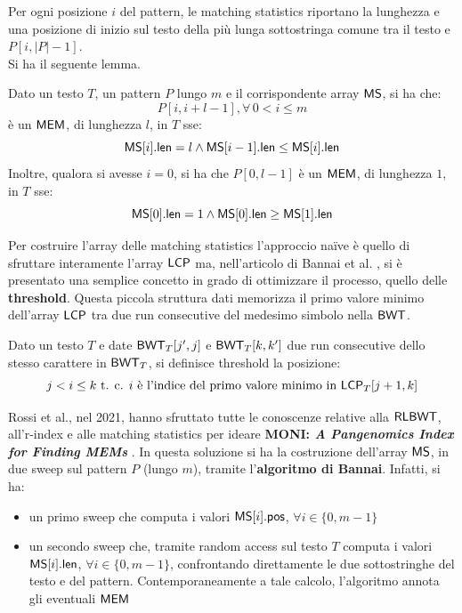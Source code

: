 \noindent
Per ogni posizione $i$ del pattern, le
matching statistics riportano la lunghezza e 
una posizione di inizio sul testo della più lunga sottostringa comune tra il
testo e $P[i, |P|-1]$. \\
Si ha il seguente lemma.
\begin{lemma}
  \label{lemma:mem}
  Dato un testo $T$, un pattern $P$ lungo $m$ e il
  corrispondente array $\mbox{\rm {\sf MS}}$, si ha che:
  \begin{equation}
    \label{eq:rlbwt5}
    P[i,i+l-1],\forall\, 0<i\leq m
  \end{equation}
  è un $\mbox{\rm {\sf MEM}}$, di lunghezza $l$, in $T$ sse:
  \begin{equation}
    \label{eq:rlbwt6}
    \mbox{\rm {\sf MS}}[i].\mbox{\rm {\sf len}}=l\land \mbox{\rm {\sf MS}}[i-1].\mbox{\rm {\sf len}}\leq \mbox{\rm {\sf MS}}[i].\mbox{\rm {\sf len}}
  \end{equation}
  Inoltre, qualora si avesse $i=0$, si ha che $P[0,l-1]$ è un $\mbox{\rm {\sf MEM}}$,
  di lunghezza $1$, in $T$ sse:
  \begin{equation}
    \label{eq:rlbwt7}
    \mbox{\rm {\sf MS}}[0].\mbox{\rm {\sf len}}=1\land \mbox{\rm {\sf MS}}[0].\mbox{\rm {\sf len}}\geq \mbox{\rm {\sf MS}}[1].\mbox{\rm {\sf len}}
  \end{equation}
\end{lemma}
Per costruire l'array delle matching statistics l'approccio na\"{i}ve è quello di
sfruttare 
interamente l'array $\mbox{\rm {\sf LCP}}$ ma, nell'articolo di Bannai et
al. \cite{bannai}, si è presentato una semplice concetto in grado di
ottimizzare il processo, quello delle \textbf{threshold}. Questa piccola
struttura dati memorizza il primo valore minimo dell'array $\mbox{\rm {\sf LCP}}$  tra due run
consecutive del medesimo simbolo nella $\mbox{\rm {\sf BWT}}$.
\begin{definizione}
  Dato un testo $T$ e date $\mbox{\rm {\sf BWT}}_T[j',j]$ e $\mbox{\rm {\sf BWT}}_T[k,k']$ due run consecutive
  dello stesso carattere in $\mbox{\rm {\sf BWT}}_T$, si definisce threshold la
  posizione:
  \begin{equation}
    \label{eq:rlbwt8}
    j< i \leq k\mbox{ t. c. } i\mbox{ è l'indice del primo valore minimo in
    }\mbox{\rm {\sf LCP}}_T[j+1,k] 
  \end{equation}
\end{definizione}
Rossi et al., nel 2021, hanno sfruttato tutte le conoscenze relative
alla $\mbox{\rm {\sf RLBWT}}$, all'r-index e alle matching statistics
per ideare \textbf{MONI:\textit{ A Pangenomics Index for Finding MEMs}}
\cite{moni}. In questa soluzione si ha la costruzione dell'array $\mbox{\rm {\sf MS}}$, in due
sweep sul pattern $P$ (lungo $m$), tramite l'\textbf{algoritmo di Bannai}.
Infatti, si ha: 
\begin{itemize}
  \item un primo sweep che computa i valori $\mbox{\rm {\sf MS}}[i].\mbox{\rm {\sf pos}}$,
  $\forall i\in\{0,m-1\}$
  \item un secondo sweep che, tramite random access sul testo $T$ computa i
  valori $\mbox{\rm {\sf MS}}[i].\mbox{\rm {\sf len}}$, $\forall i\in\{0,m-1\}$, confrontando direttamente 
  le due sottostringhe del testo e
  del pattern. Contemporaneamente a tale calcolo, l'algoritmo annota gli
  eventuali $\mbox{\rm {\sf MEM}}$
\end{itemize}

